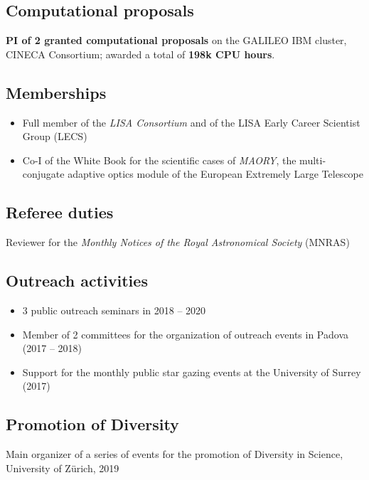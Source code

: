 \subsection*{{Computational proposals}}
\textbf{PI of 2 granted computational proposals} on the GALILEO IBM cluster, CINECA Consortium; awarded a total of \textbf{198k CPU hours}.

\subsection*{{Memberships}}
\begin{itemize}[leftmargin=3.5mm]
\setlength\itemsep{-2pt}
\item Full member of the \textit{{LISA Consortium}} and of the LISA Early Career Scientist Group (LECS)
\item Co-I of the White Book for the scientific cases of  \textit{MAORY}, the multi-conjugate adaptive optics module of the European Extremely Large Telescope
\end{itemize}



\subsection*{{Referee duties}}
Reviewer for the {\it Monthly Notices of the Royal Astronomical Society} (MNRAS)


\subsection*{{Outreach activities}}
\begin{itemize}[leftmargin=3.5mm]
\setlength\itemsep{-2pt}

\item 3 public outreach seminars in 2018 -- 2020

\item Member of 2 committees for the organization of outreach events in Padova (2017 -- 2018)

\item Support for the monthly public star gazing events at the University of Surrey (2017)
\end{itemize}


\subsection*{{Promotion of Diversity}}

Main organizer of a series of events for the {promotion of Diversity in Science}, University of Z\"urich, 2019
